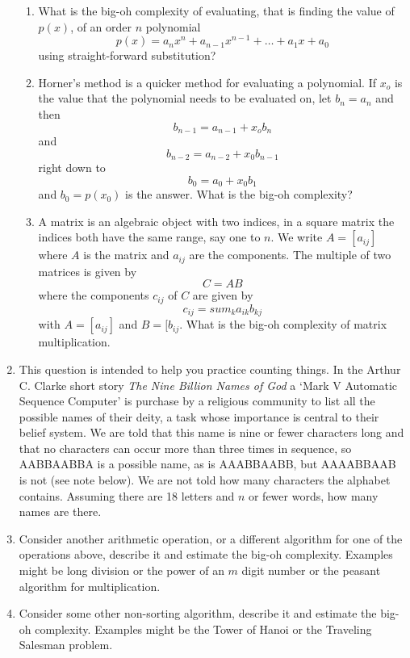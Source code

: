 \documentclass[11pt,a4paper]{scrartcl}
\begin{document}
\begin{enumerate}
\begin{enumerate}
\item What is the big-oh complexity of evaluating, that is finding the
  value of $p(x)$, of an order $n$ polynomial
$$p(x)=a_n x^n +a_{n-1}x^{n-1}+\ldots+a_1x+a_0$$
using straight-forward substitution?
\item Horner's method is a quicker method for evaluating a
  polynomial. If $x_o$ is the value that the polynomial needs to be
  evaluated on, let $b_n=a_n$ and then 
$$ b_{n-1}=a_{n-1}+x_o b_{n}$$
and
$$ b_{n-2}=a_{n-2}+x_0 b_{n-1}$$
right down to 
$$ b_0=a_0+x_0b_1$$ and $b_0=p(x_0)$ is the answer. What is the big-oh
complexity?
\item A matrix is an algebraic object with two indices, in a square
  matrix the indices both have the same range, say one to $n$. We
  write $A=[a_{ij}]$ where $A$ is the matrix and $a_{ij}$ are the
  components. The multiple of two matrices is given by
$$C=AB$$
where the components $c_{ij}$ of $C$ are given by
$$
c_{ij}=sum_{k}a_{ik}b_{kj}
$$ with $A=[a_{ij}]$ and $B=[b_{ij}$. What is the big-oh complexity of
  matrix multiplication.




\end{enumerate}

\item This question is intended to help you practice counting
  things. In the Arthur C. Clarke short story \textsl{The Nine Billion
    Names of God} a \lq{}Mark V Automatic Sequence Computer\rq{} is
  purchase by a religious community to list all the possible names of
  their deity, a task whose importance is central to their belief
  system. We are told that this name is nine or fewer characters long
  and that no characters can occur more than three times in sequence,
  so AABBAABBA is a possible name, as is AAABBAABB, but AAAABBAAB is
  not (see note below). We are not told how many characters the alphabet
  contains. Assuming there are 18 letters and $n$ or fewer words, how
  many names are there.

\item Consider another arithmetic operation, or a different algorithm
  for one of the operations above, describe it and estimate the big-oh
  complexity. Examples might be long division or the power of an $m$
  digit number or the peasant algorithm for multiplication.

\item Consider some other non-sorting algorithm, describe it and
  estimate the big-oh complexity. Examples might be the Tower of Hanoi
  or the Traveling Salesman problem.
\end{enumerate}
\end{document}
